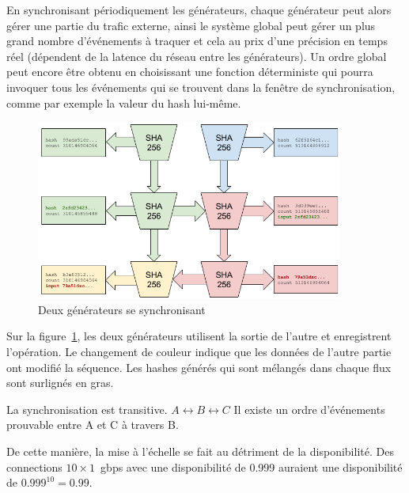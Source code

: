 \documentclass[12pt]{article}
\begin{document}
En synchronisant périodiquement les générateurs, chaque générateur peut alors gérer une partie du trafic externe, ainsi le système global peut gérer un plus grand nombre d'événements à traquer et cela au prix d'une précision en temps réel (dépendent de la latence du réseau entre les générateurs). Un ordre global peut encore être obtenu en choisissant une fonction déterministe qui pourra invoquer tous les événements qui se trouvent dans la fenêtre de synchronisation, comme par exemple la valeur du hash lui-même.


\begin{figure}
  \begin{center}
    \centering
    \includegraphics[width=0.9\textwidth]{figures/fig_5.png}
    \caption[Fig 5]{Deux générateurs se synchronisant\label{fig:poh_mise_echelle}}
  \end{center}
  \end{figure}

Sur la figure~\ref{fig:poh_mise_echelle}, les deux générateurs utilisent la sortie de l'autre et enregistrent l'opération. Le changement de couleur indique que les données de l’autre partie ont modifié la séquence. Les hashes générés qui sont mélangés dans chaque flux sont surlignés en gras.

La synchronisation est transitive. \(A \leftrightarrow B \leftrightarrow C\)  Il existe un ordre d'événements prouvable entre A et C à travers B.

De cette manière, la mise à l'échelle se fait au détriment de la disponibilité. Des connections $10 \times 1$~gbps avec une disponibilité de 0.999 auraient une disponibilité de \(0.999^{10} = 0.99 \).
\end{document}
